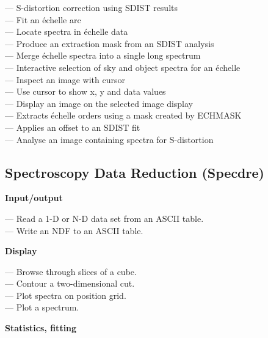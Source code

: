  --- S-distortion correction using SDIST results\\
 --- Fit an \'echelle arc\\
 --- Locate spectra in \'echelle data\\
 --- Produce an extraction mask from an SDIST analysis\\
 --- Merge \'echelle spectra into a single long spectrum\\
 --- Interactive selection of sky and object spectra for an \'echelle\\
 --- Inspect an image with cursor\\
 --- Use cursor to show x, y and data values\\
 --- Display an image on the selected image display\\
 --- Extracts \'echelle orders using a mask created by ECHMASK\\
 --- Applies an offset to an SDIST fit\\
 --- Analyse an image containing spectra for S-distortion


\subsection{\label{classifspecdre}Spectroscopy Data Reduction (Specdre)}

{\bf Input/output}

 --- Read a 1-D or N-D data set from an ASCII table.\\
 --- Write an NDF to an ASCII table.

{\bf Display}

 --- Browse through slices of a cube.\\
 --- Contour a two-dimensional cut.\\
 --- Plot spectra on position grid.\\
 --- Plot a spectrum.

{\bf Statistics, fitting}

